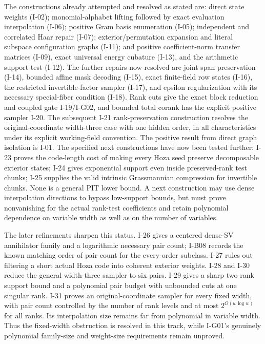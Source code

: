 The constructions already attempted and resolved as stated are:
direct state weights (I-02); monomial-alphabet lifting followed
by exact evaluation interpolation (I-06); positive Gram basis
enumeration (I-05); independent and correlated Haar repair
(I-07); exterior/permutation expansion and literal subspace
configuration graphs (I-11); and positive coefficient-norm
transfer matrices (I-09), exact universal energy cubature (I-13),
and the arithmetic support test (I-12).  The further repairs now
resolved are joint span preservation (I-14), bounded affine mask
decoding (I-15), exact finite-field row states (I-16), the restricted
invertible-factor sampler (I-17), and epsilon regularization with
its necessary special-fiber condition (I-18).  Rank cuts give the exact
block reduction and coupled gate I-19/I-G02, and bounded total corank
has the explicit positive sampler I-20.  The subsequent I-21
rank-preservation construction resolves the original-coordinate
width-three case with one hidden order, in all characteristics
under its explicit working-field convention.  The positive result from
direct graph isolation is I-01.  The specified next constructions have now been tested further:
I-23 proves the code-length cost of making every Hoza seed preserve
decomposable exterior states; I-24 gives exponential support even
inside preserved-rank test chunks; I-25 supplies the valid intrinsic
Grassmannian compression for invertible chunks.  None is a general
PIT lower bound.  A next construction may use dense interpolation
directions to bypass low-support bounds, but must prove nonvanishing
for the actual rank-test coefficients and retain polynomial dependence
on variable width as well as on the number of variables.

The later refinements sharpen this status.  I-26 gives a centered dense-SV
annihilator family and a logarithmic necessary pair count; I-B08 records
the known matching order of pair count for the every-order subclass.
I-27 rules out filtering a short actual Hoza code into coherent exterior
weights.  I-28 and I-30 reduce the general width-three sampler to six
pairs.  I-29 gives a sharp two-rank support bound and a polynomial pair
budget with unbounded cuts at one singular rank.  I-31 proves an
original-coordinate sampler for every fixed width, with pair count
controlled by the number of rank levels and at most
$2^{O(w\log w)}$ for all ranks.  Its interpolation size remains far
from polynomial in variable width.  Thus the fixed-width obstruction
is resolved in this track, while I-G01's genuinely polynomial
family-size and weight-size requirements remain unproved.


